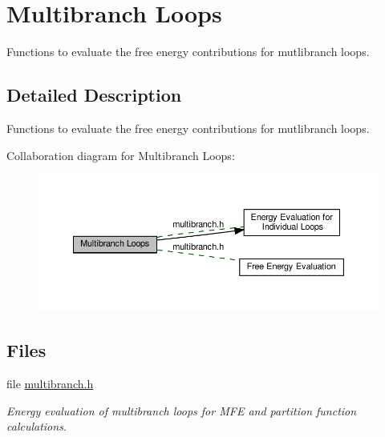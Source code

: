\hypertarget{group__eval__loops__mb}{}\section{Multibranch Loops}
\label{group__eval__loops__mb}


Functions to evaluate the free energy contributions for mutlibranch loops.  




\subsection{Detailed Description}
Functions to evaluate the free energy contributions for mutlibranch loops. 

Collaboration diagram for Multibranch Loops\+:
\nopagebreak
\begin{figure}[H]
\begin{center}
\leavevmode
\includegraphics[width=350pt]{group__eval__loops__mb}
\end{center}
\end{figure}
\subsection*{Files}
\begin{DoxyCompactItemize}
\item 
file \hyperlink{multibranch_8h}{multibranch.\+h}
\begin{DoxyCompactList}\small\item\em Energy evaluation of multibranch loops for M\+FE and partition function calculations. \end{DoxyCompactList}\end{DoxyCompactItemize}
